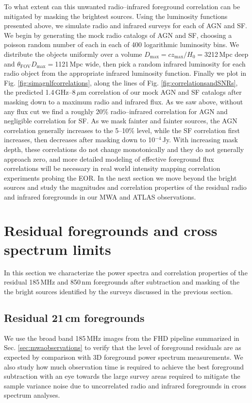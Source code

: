\documentclass{emulateapj}
\newcommand{\maxtext}{\text{max}}
\begin{document}
To what extent can this unwanted radio--infrared foreground correlation can be mitigated by masking the brightest sources. Using the luminosity functions presented above, we simulate radio and infrared surveys for each of AGN and SF. We begin by generating the mock radio catalogs of AGN and SF, choosing a poisson random number of each in each of 400 logarithmic luminosity bins. We distribute the objects uniformly over a volume $D_\maxtext=cz_\maxtext/H_0=$3212\,Mpc deep and $\theta_{\text{FOV}}D_\maxtext=$1121\,Mpc wide, then pick a random infrared luminosity for each radio object from the appropriate infrared luminosity function. Finally we plot in Fig. \ref{fig:simagnlfcorrelations}, along the lines of Fig. \ref{fig:correlationsandSNRs}, the predicted 1.4\,GHz--8\,$\mu$m correlation of our mock AGN and SF catalogs after masking down to a maximum radio and infrared flux. As we saw above, without any flux cut we find a roughly 20\% radio--infrared correlation for AGN and negligible correlation for SF. As we mask fainter and fainter sources, the AGN correlation generally increases to the 5--10\% level, while the SF correlation first increases, then decreases after masking down to 10$^{-4}$\,Jy. With increasing mask depth, these correlations do not change monotonically and they do not generally approach zero, and more detailed modeling of effective foreground flux correlations will be necessary in real world intensity mapping correlation experiments probing the EOR. In the next section we move beyond the bright sources and study the magnitudes and correlation properties of the residual radio and infrared foregrounds in our MWA and ATLAS observations.


\section{Residual foregrounds and cross spectrum limits}

In this section we characterize the power spectra and correlation properties of the residual 185\,MHz and 850\,nm foregrounds after subtraction and masking of the the bright sources identified by the surveys discussed in the previous section.

\subsection{Residual 21\,cm foregrounds}
\label{sec:res21fgs}

We use the broad band 185\,MHz images from the FHD pipeline summarized in Sec. \ref{sec:mwaobservations} to verify that the level of foreground residuals are as expected by comparison with 3D foreground power spectrum measurements. We also study how much observation time is required to achieve the best foreground subtraction with an eye towards the large survey areas required to mitigate the sample variance noise due to uncorrelated radio and infrared foregrounds in cross spectrum analyses. 
\end{document}
